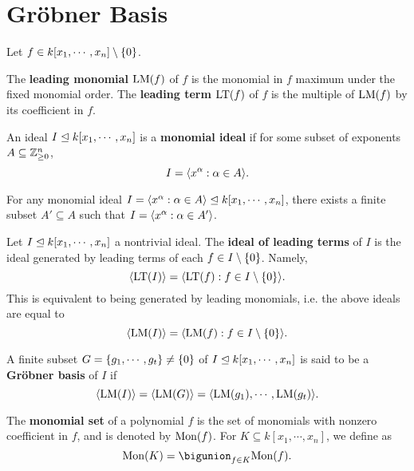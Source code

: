 \chapter{Gr{\"o}bner Basis}

Let \(f \in k[x_1, \cdots, x_n] \setminus \{ 0 \}\).

\begin{definition} %
    \label{def:LeadingMonomialTerm}
    The \textbf{leading monomial} \(\mathrm{LM}(f)\) of \(f\) is the monomial in
    \(f\) maximum under the fixed monomial order. The \textbf{leading term}
    \(\mathrm{LT}(f)\) of \(f\) is the multiple of \(\mathrm{LM}(f)\) by its
    coefficient in \(f\).
\end{definition}

\begin{definition} %
    \label{def:MonomialIdeal}
    An ideal \(I \trianglelefteq k[x_1, \cdots, x_n]\) is a \textbf{monomial ideal}
    if for some subset of exponents \(A \subseteq \mathbb{Z}_{\ge 0}^n\),
    \[I = \langle x^\alpha : \alpha \in A \rangle.\]
\end{definition}

\begin{theorem} %
    For any monomial ideal \(I = \langle x^\alpha : \alpha \in A \rangle \trianglelefteq
    k[x_1, \cdots, x_n]\), there exists a finite subset \(A' \subseteq A\)
    such that \(I = \langle x^\alpha : \alpha \in A' \rangle\).
\end{theorem}

\begin{definition} %
    Let \(I \trianglelefteq k[x_1, \cdots, x_n]\) a nontrivial ideal. The
    \textbf{ideal of leading terms} of \(I\) is the ideal generated by leading
    terms of each \(f \in I \setminus \{ 0 \}\). Namely,
    \[\langle \mathrm{LT}(I) \rangle
    = \langle \mathrm{LT}(f) : f \in I \setminus \{ 0 \} \rangle.\]
    This is equivalent to being generated by leading monomials, i.e. the above
    ideals are equal to
    \[\langle \mathrm{LM}(I) \rangle
    = \langle \mathrm{LM}(f) : f \in I \setminus \{ 0 \} \rangle.\]
\end{definition}

\begin{definition} %
    A finite subset \(G = \{ g_1, \cdots, g_t \} \ne \{ 0 \}\) of \(I \trianglelefteq
    k[x_1, \cdots, x_n]\) is said to be a \textbf{Gr{\"o}bner basis} of \(I\) if
    \[\langle \mathrm{LM}(I) \rangle = \langle \mathrm{LM}(G) \rangle
    = \langle \mathrm{LM}(g_1), \cdots, \mathrm{LM}(g_t) \rangle.\]
\end{definition}

\begin{definition}
    \label{def:MonomialSet}
    The \textbf{monomial set} of a polynomial \(f\) is the set of monomials with
    nonzero coefficient in \(f\), and is denoted by \(\mathrm{Mon}(f)\). For \(K
    \subseteq k[x_1, \cdots, x_n]\), we define as
    \[\monset(K) = \bigunion_{f \in K} \monset(f).\]
\end{definition}